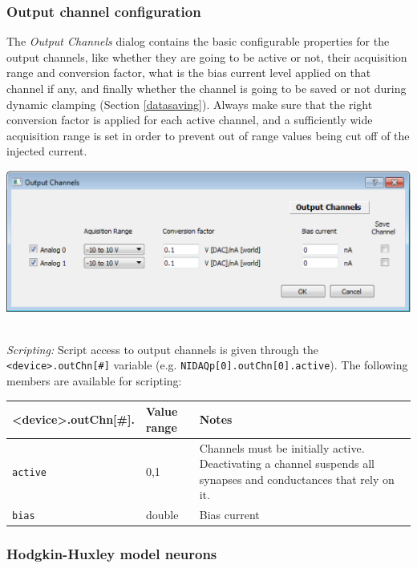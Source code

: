\documentclass{article}
\begin{document}
\subsubsection{Output channel configuration} \label{outchnconfig}

The \emph{Output Channels} dialog contains the basic configurable properties
for the output channels, like whether they are going to be active or not,
their acquisition range and conversion factor, what is the bias current
level applied on that channel if any, and finally whether the channel is
going to be saved or not during dynamic clamping (Section
\ref{datasaving}). Always make sure that the right conversion factor is
applied for each active channel, and a sufficiently wide acquisition range
is set in order to prevent out of range values being cut off of the
injected current.\\

\noindent
\parbox{\textwidth}{
	\includegraphics[scale=0.5]{outputChnDialog}
} \\[0.2cm]

\noindent
\emph{Scripting:} Script access to output channels is given through the \texttt{<device>.outChn[\#]} variable
(e.g. \texttt{NIDAQp[0].outChn[0].active}).
The following members are available for scripting: \\
\begin{tabularx}{\linewidth}{|ll|X|}
	\hline
	{\bf \textless{}device\textgreater.outChn[\#].\textvisiblespace} & {\bf Value range} & {\bf Notes} \\
	\hline
	\texttt{active} & 0,1 & Channels must be initially active. Deactivating a channel suspends all
	synapses and conductances that rely on it. \\
	\texttt{bias} & double & Bias current \\
	\hline
\end{tabularx}


\subsubsection{Hodgkin-Huxley model neurons} \label{HHmodels}
\end{document}
